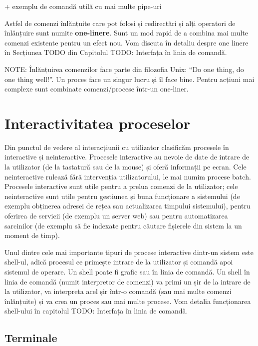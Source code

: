 +     exemplu de comandă utilă cu mai multe pipe-uri

Astfel de comenzi înlănțuite care pot folosi și redirectări și alți operatori de
înlănțuire sunt numite \textbf{one-linere}. Sunt un mod rapid de a combina mai multe
comenzi existente pentru un efect nou. Vom discuta în detaliu despre one linere
în Secțiunea TODO din Capitolul TODO: Interfața în linia de comandă.

NOTE: Înlănțuirea comenzilor face parte din filozofia Unix: “Do one thing, do
one thing well!”. Un proces face un singur lucru și îl face bine. Pentru acțiuni
mai complexe sunt combinate comenzi/procese într-un one-liner.

\section{Interactivitatea proceselor}
\label{sec:procese-interactivitate}

Din punctul de vedere al interacțiunii cu utilizator clasificăm procesele în
interactive și neinteractive. Procesele interactive au nevoie de date de intrare
de la utilizator (de la tastatură sau de la mouse) și oferă informații pe ecran.
Cele neinteractive rulează fără intervenția utilizatorului, le mai numim procese
batch. Procesele interactive sunt utile pentru a prelua comenzi de la
utilizator; cele neinteractive sunt utile pentru gestiunea și buna funcționare a
sistemului (de exemplu obținerea adresei de rețea sau actualizarea timpului
sistemului), pentru oferirea de servicii (de exemplu un server web) sau pentru
automatizarea sarcinilor (de exemplu să fie indexate pentru căutare fișierele
din sistem la un moment de timp).

Unul dintre cele mai importante tipuri de procese interactive dintr-un sistem
este shell-ul, adică procesul ce primește intrare de la utilizator și comandă
apoi sistemul de operare. Un shell poate fi grafic sau în linia de comandă. Un
shell în linia de comandă (numit interpretor de comenzi) va primi un șir de la
intrare de la utilizator, va interpreta acel șir într-o comandă (sau mai multe
comenzi înlănțuite) și va crea un proces sau mai multe procese. Vom detalia
funcționarea shell-ului în capitolul TODO: Interfața în linia de comandă.

\subsection{Terminale}
\label{sec:procese-interactivitate-terminale}

